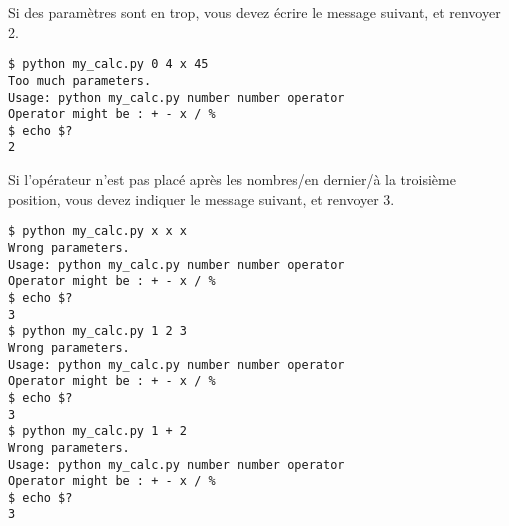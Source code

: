 \bigskip

\noindent Si des paramètres sont en trop, vous devez écrire le message suivant, et renvoyer 2.

\bigskip

\noindent {}

\noindent {}

\noindent {}

\bigskip

\lstset{language=sh}
\begin{lstlisting}[frame=single,title={Cas d'erreur 2 : trop de paramètres}]
$ python my_calc.py 0 4 x 45
Too much parameters.
Usage: python my_calc.py number number operator
Operator might be : + - x / %
$ echo $?
2
\end{lstlisting}

\bigskip

\noindent Si l'opérateur n'est pas placé après les nombres/en dernier/à la troisième position, vous devez indiquer le message suivant, et renvoyer 3.

\bigskip

\noindent {}

\noindent {}

\noindent {}

\bigskip

\lstset{language=sh}
\begin{lstlisting}[frame=single,title={Cas d'erreur 3 : pas les bons paramètres}]
$ python my_calc.py x x x
Wrong parameters.
Usage: python my_calc.py number number operator
Operator might be : + - x / %
$ echo $?
3
$ python my_calc.py 1 2 3
Wrong parameters.
Usage: python my_calc.py number number operator
Operator might be : + - x / %
$ echo $?
3
$ python my_calc.py 1 + 2
Wrong parameters.
Usage: python my_calc.py number number operator
Operator might be : + - x / %
$ echo $?
3
\end{lstlisting}

